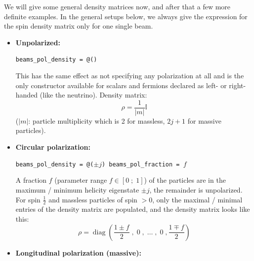 \documentclass[12pt]{book}
\DeclareMathOperator{\diag}{diag}
\newcommand{\ttt}[1]{\texttt{#1}}
\begin{document}
We will give some general density
matrices now, and after that a few more definite examples. In the
general setups below, we always give the expression for the spin
density matrix only for one single beam.
%
{

\newcommand{\cssparse}[4]{%
\begin{pmatrix}
  #1     & 0      & \cdots & \cdots & #3     \\
  0      & 0      & \ddots &        & 0      \\
  \vdots & \ddots & \ddots & \ddots & \vdots \\
  0      &        & \ddots & 0      & 0      \\
  #4     & \cdots & \cdots & 0      & #2
\end{pmatrix}%
}
%

\begin{itemize}
\item {\bf Unpolarized:}
  \begin{center}
    \begin{footnotesize}
    \ttt{beams\_pol\_density = @()}
    \end{footnotesize}
  \end{center}
This has the same effect as not specifying any
polarization at all and is the only constructor available for scalars and
fermions declared as left- or right-handed (like the neutrino). Density matrix:
\[ \rho = \frac{1}{|m|}\mathbb{I} \]
($|m|$: particle multiplicity which is 2 for massless, $2j + 1$ for massive particles).
%
\item {\bf Circular polarization:}
  \begin{center}
    \begin{footnotesize}
    \ttt{beams\_pol\_density = @($\pm j$) \qquad beams\_pol\_fraction
      = $f$}
    \end{footnotesize}
  \end{center}
A fraction $f$ (parameter range $f \in \left[0\;;\;1\right]$) of
the particles are in the maximum / minimum helicity eigenstate $\pm
j$, the remainder is unpolarized. For spin $\frac{1}{2}$ and massless
particles of spin $>0$, only the maximal / minimal entries of the
density matrix are populated, and the density matrix looks like this:
\[ \rho = \diag\left(\frac{1\pm f}{2}\;,\;0\;,\;\dots\;,\;0\;,
\frac{1\mp f}{2}\right) \]
%
\item {\bf Longitudinal polarization (massive):}
  \begin{center}
    \begin{footnotesize}

\end{footnotesize}
\end{center}
\end{itemize}}
\end{document}
